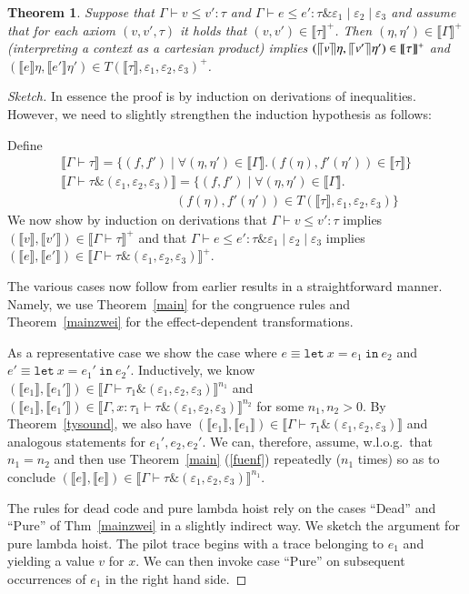 \documentclass[nocopyrightspace,preprint]{sigplanconf}
\newcommand{\keywd}[1]{\mathtt{#1}}
\newcommand{\letin}[2]{\keywd{let}\:{#1}\!=\!{#2}\:\keywd{in}\:}
\newcommand{\eff}{\varepsilon}
\newcommand{\sem}[1]{\ensuremath{\llbracket {#1} \rrbracket}}
\newcommand{\semC}[1]{\ensuremath{\llbracket {#1} \rrbracket}}
\newcommand{\semV}[1]{\ensuremath{\llceil {#1} \rrceil
}}
\newtheorem{theorem}{Theorem}[section]
\newcommand{\myety}[4]{{#1}\mathrel{\&}{#2} \mid #3 \mid #4}
\begin{document}
\begin{theorem}
\label{eqthm}
Suppose that $\Gamma\vdash v\leq v':\tau$ and $\Gamma\vdash e\leq e': \myety{\tau}{\eff_1}{\eff_2}{\eff_3}$ and assume that for each 
 axiom $(v,v',\tau)$ it holds that $(v,v')\in\sem{\tau}^+$.
 Then $(\eta,\eta')\in\sem{\Gamma}^+$ (interpreting a context as a cartesian product) implies $(\semV{v}\eta,\semV{v'}\eta')\in\sem{\tau}^+$ and 
$(\semC{e}\eta,\semC{e'}\eta')\in T(\sem{\tau},\eff_1,\eff_2,\eff_3)^+$. 
\end{theorem}
\begin{proof}[Sketch]
In essence the proof is by induction on derivations of inequalities. However, we need to slightly strengthen the induction hypothesis as follows: 

Define 
\[
\begin{array}{l}

\sem{\Gamma\vdash \tau}=\{(f,f')\mid\forall (\eta,\eta')\in\sem{\Gamma}.(f(\eta),f'(\eta'))\in\sem{\tau}\}\\
\sem{\Gamma\vdash \tau\&(\eff_1,\eff_2,\eff_3)}=\{(f,f')\mid\forall (\eta,\eta')\in\sem{\Gamma}.\\ \qquad \qquad \qquad \qquad \quad (f(\eta),f'(\eta'))\in T(\sem{\tau},\eff_1,\eff_2,\eff_3)\}
\end{array}
\]
We now show by induction on derivations that 
$\Gamma\vdash v\leq v':\tau$ implies $(\sem{v},\sem{v'})\in \sem{\Gamma\vdash \tau}^+$ and that  $\Gamma\vdash e\leq e': \myety{\tau}{\eff_1}{\eff_2}{\eff_3}$  implies 
$(\sem{e},\sem{e'})\in \sem{\Gamma\vdash \tau\&(\eff_1,\eff_2,\eff_3)}^+$. 

The various cases now follow from earlier results in a straightforward manner. Namely, we use Theorem~\ref{main} for the congruence rules and 
Theorem~\ref{mainzwei} for the effect-dependent transformations. 

As a representative case we show the case where $e\equiv\letin{x}{e_1}{e_2}$ and $e'\equiv \letin{x}{e_1'}{e_2'}$. Inductively, we know 
$(\sem{e_1},\sem{e_1'})\in\sem{\Gamma\vdash \tau_1\&(\eff_1,\eff_2,\eff_3)}^{n_1}$ and $(\sem{e_1},\sem{e_1'})\in\sem{\Gamma,x{:}\tau_1\vdash \tau\&(\eff_1,\eff_2,\eff_3)}^{n_2}$ for some $n_1,n_2>0$. By Theorem~\ref{tysound}, we also have
$(\sem{e_1},\sem{e_1})\in\sem{\Gamma\vdash \tau_1\&(\eff_1,\eff_2,\eff_3)}$ and analogous statements for $e_1',e_2,e_2'$. We can, therefore, assume, w.l.o.g.\ that $n_1=n_2$ and then use Theorem~\ref{main} (\ref{fuenf}) repeatedly ($n_1$ times) so as to conclude $(\sem{e},\sem{e})\in\sem{\Gamma\vdash \tau\&(\eff_1,\eff_2,\eff_3)}^{n_1}$. 

The rules for dead code and pure lambda hoist rely on 
 the cases ``Dead'' and ``Pure'' of Thm~\ref{mainzwei} in a slightly indirect way. We sketch the argument for pure lambda hoist. The pilot trace begins with a trace belonging to $e_1$ and yielding a value $v$ for $x$. We can then invoke case ``Pure'' on subsequent occurrences of $e_1$ in the right hand side. 
\end{proof}
\end{document}
